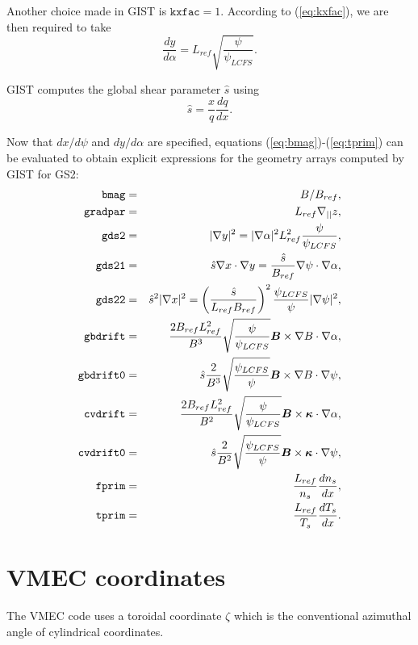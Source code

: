 \documentclass[11pt,letter]{article}
\newcommand{\vect}[1]{\mbox{\boldmath $#1$}}
\newcommand{\kxfac}{\mathtt{kxfac}}
\newcommand{\bmag}{\mathtt{bmag}}
\newcommand{\gdstwo}{\mathtt{gds2}}
\newcommand{\gdstwoone}{\mathtt{gds21}}
\newcommand{\gdstwotwo}{\mathtt{gds22}}
\newcommand{\gbdrift}{\mathtt{gbdrift}}
\newcommand{\gbdriftO}{\mathtt{gbdrift0}}
\newcommand{\cvdrift}{\mathtt{cvdrift}}
\newcommand{\cvdriftO}{\mathtt{cvdrift0}}
\newcommand{\fprim}{\mathtt{fprim}}
\newcommand{\tprim}{\mathtt{tprim}}
\newcommand{\gradpar}{\mathtt{gradpar}}
\begin{document}
Another choice made in GIST is $\kxfac=1$. According to (\ref{eq:kxfac}), we are then required to take 
\begin{equation}
\frac{d y}{d\alpha} = L_{ref} \sqrt{\frac{\psi}{\psi_{LCFS}}} .
\label{eq:dy_dalpha}
\end{equation}

GIST computes the global shear parameter $\hat{s}$ using
\begin{equation}
\hat{s} = \frac{x}{q} \frac{dq}{dx}.
\end{equation}

Now that $dx/d\psi$ and $dy/d\alpha$ are specified, equations (\ref{eq:bmag})-(\ref{eq:tprim}) 
can be evaluated to obtain explicit expressions for the geometry arrays computed by GIST for GS2:
\begin{eqnarray}
\bmag &=& B/B_{ref}, \label{eq:gist_Bref}\\
\gradpar &=& L_{ref} \nabla_{||} z, \\
\gdstwo &=& |\nabla y|^2 = |\nabla\alpha|^2 L_{ref}^2 \frac{\psi}{\psi_{LCFS}}, \\
\gdstwoone &=& \hat{s} \nabla x \cdot \nabla y = \frac{\hat{s}}{B_{ref}} \nabla\psi\cdot\nabla\alpha , \\
\gdstwotwo &=& \hat{s}^2|\nabla x |^2  = \left( \frac{\hat{s}}{L_{ref} B_{ref}}\right)^2 \frac{\psi_{LCFS}}{\psi} |\nabla\psi |^2, \\
\gbdrift &=& \frac{2 B_{ref} L_{ref}^2}{B^3} \sqrt{\frac{\psi}{\psi_{LCFS}}} \vect{B}\times\nabla B\cdot \nabla \alpha, \\
\gbdriftO &=& \hat{s} \frac{2 }{B^3}   \sqrt{\frac{\psi_{LCFS}}{\psi}} \vect{B}\times\nabla B\cdot \nabla \psi, \\
\cvdrift &=& \frac{2 B_{ref} L_{ref}^2}{B^2} \sqrt{\frac{\psi}{\psi_{LCFS}}} \vect{B}\times\vect{\kappa} \cdot \nabla \alpha, \\
\cvdriftO &=& \hat{s} \frac{2 }{B^2}  \sqrt{\frac{\psi_{LCFS}}{\psi}} \vect{B}\times\vect{\kappa} \cdot \nabla \psi,  \label{eq:gist_cvdrift0} \\
\fprim &=&   \frac{L_{ref}}{n_s} \frac{d n_s}{d x}, \\
\tprim &=&   \frac{L_{ref}}{T_s} \frac{d T_s}{d x}. 
\end{eqnarray}

\section{VMEC coordinates}

The VMEC code uses a toroidal coordinate $\zeta$ which is the conventional azimuthal angle of cylindrical coordinates. 
\end{document}
